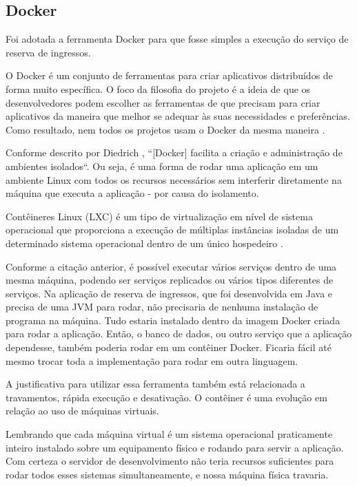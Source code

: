 \subsection{Docker}\label{docker}

Foi adotada a ferramenta Docker para que fosse simples a execução do serviço de reserva de ingressos.

\begin{citacao}
O Docker é um conjunto de ferramentas para criar aplicativos distribuídos de forma muito específica.
O foco da filosofia do projeto é a ideia de que os desenvolvedores podem escolher as ferramentas
de que precisam para criar aplicativos da maneira que melhor se adequar às suas necessidades e preferências.
Como resultado, nem todos os projetos usam o Docker da mesma maneira \cite{solomon-hykes}.
\end{citacao}

Conforme descrito por Diedrich \cite{mundodocker-o-que-e-docker}, ``[Docker] facilita a criação e administração de ambientes isolados``.
Ou seja, é uma forma de rodar uma aplicação em um ambiente Linux com todos os recursos necessários sem interferir
diretamente na máquina que executa a aplicação - por causa do isolamento.

\begin{citacao}
Contêineres Linux (LXC) é um tipo de
virtualização em nível de sistema operacional que proporciona a execução de múltiplas instâncias isoladas de um determinado
sistema operacional dentro de um único hospedeiro \cite{sinestec-01}.
\end{citacao}

Conforme a citação anterior, é possível executar vários serviços dentro de uma mesma máquina, podendo ser serviços
replicados ou vários tipos diferentes de serviços.
Na aplicação de reserva de ingressos, que foi desenvolvida em Java e precisa de uma JVM para rodar, não precisaria
de nenhuma instalação de programa na máquina.
Tudo estaria instalado dentro da imagem Docker criada para rodar a aplicação.
Então, o banco de dados, ou outro serviço que a aplicação dependesse, também poderia rodar em um contêiner Docker.
Ficaria fácil até mesmo trocar toda a implementação para rodar em outra linguagem.

A justificativa para utilizar essa ferramenta também está relacionada a travamentos, rápida execução e desativação.
O contêiner é uma evolução em relação ao uso de máquinas virtuais.

\begin{citacao}
Lembrando que cada máquina virtual é um sistema operacional praticamente inteiro instalado sobre um equipamento físico e
rodando para servir a aplicação. Com certeza o servidor de desenvolvimento não teria recursos suficientes para rodar
todos esses sistemas simultaneamente, e nossa máquina física travaria\cite{aprendendo-docker}.
\end{citacao}


